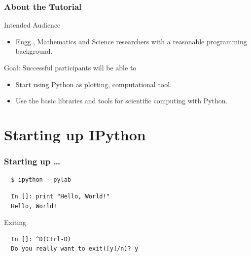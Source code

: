 \documentclass[14pt,compress]{beamer}
\begin{document}
\begin{frame}
  \frametitle{About the Tutorial}
  \begin{block}{Intended Audience}
  \begin{itemize}
       \item Engg., Mathematics and Science researchers with a
           reasonable programming background.
  \end{itemize}
  \end{block}  

  \begin{block}{Goal: Successful participants will be able to}
    \begin{itemize}
      \item Start using Python as plotting, computational tool.
      \item Use the basic libraries and tools for scientific computing
          with Python.
    \end{itemize}
  \end{block}
\end{frame}


\section{Starting up IPython}
\begin{frame}[fragile]
\frametitle{Starting up \ldots}
\begin{block}{}
\begin{lstlisting}
  $ ipython --pylab
\end{lstlisting} %
\end{block}
\begin{lstlisting}     
  In []: print "Hello, World!"
  Hello, World!
\end{lstlisting}
Exiting
\begin{lstlisting}
  In []: ^D(Ctrl-D)
  Do you really want to exit([y]/n)? y
\end{lstlisting}
\end{frame}
\end{document}
